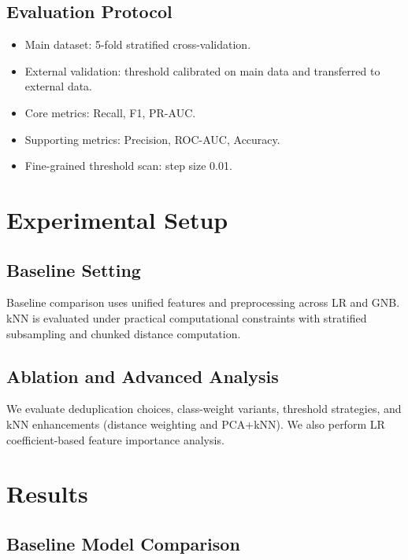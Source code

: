 \documentclass[conference]{IEEEtran}
\begin{document}
\subsection{Evaluation Protocol}
\begin{itemize}
  \item Main dataset: 5-fold stratified cross-validation.
  \item External validation: threshold calibrated on main data and transferred to external data.
  \item Core metrics: Recall, F1, PR-AUC.
  \item Supporting metrics: Precision, ROC-AUC, Accuracy.
  \item Fine-grained threshold scan: step size 0.01.
\end{itemize}

\section{Experimental Setup}
\subsection{Baseline Setting}
Baseline comparison uses unified features and preprocessing across LR and GNB. kNN is evaluated under practical computational constraints with stratified subsampling and chunked distance computation.

\subsection{Ablation and Advanced Analysis}
We evaluate deduplication choices, class-weight variants, threshold strategies, and kNN enhancements (distance weighting and PCA+kNN). We also perform LR coefficient-based feature importance analysis.

\section{Results}
\subsection{Baseline Model Comparison}
\begin{table}[H]
\centering
\caption{Baseline results (5-fold + external validation)}
\label{tab:baseline_results}
\end{table}
\end{document}
